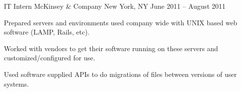 \begin{cventries}
	\cventry
		{IT Intern} %
		{McKinsey \& Company} %
		{New York, NY} %
		{June 2011 – August 2011} %
		{
			\begin{cvitems} %
				\item {Prepared servers and environments used company wide with UNIX based web software (LAMP, Rails, etc).}
				\item {Worked with vendors to get their software running on these servers and customized/configured for use.}
				\item {Used software supplied APIs to do migrations of files between versions of user systems.}
			\end{cvitems}
		}

\end{cventries}
